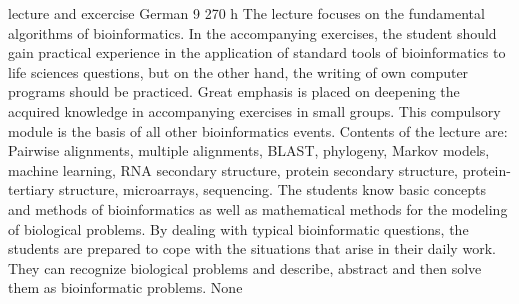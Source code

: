 {lecture and excercise}
{German}
{9}
{270 h}
{The lecture focuses on the fundamental algorithms of bioinformatics. In the accompanying exercises, the student should gain practical experience in the application of standard tools of bioinformatics to life sciences questions, but on the other hand, the writing of own computer programs should be practiced. Great emphasis is placed on deepening the acquired knowledge in accompanying exercises in small groups. This compulsory module is the basis of all other bioinformatics events. Contents of the lecture are: Pairwise alignments, multiple alignments, BLAST, phylogeny, Markov models, machine learning, RNA secondary structure, protein secondary structure, protein-tertiary structure, microarrays, sequencing.
} 
{The students know basic concepts and methods of bioinformatics as well as mathematical methods for the modeling of biological problems. By dealing with typical bioinformatic questions, the students are prepared to cope with the situations that arise in their daily work. They can recognize biological problems and describe, abstract and then solve them as bioinformatic problems.
}
{None}